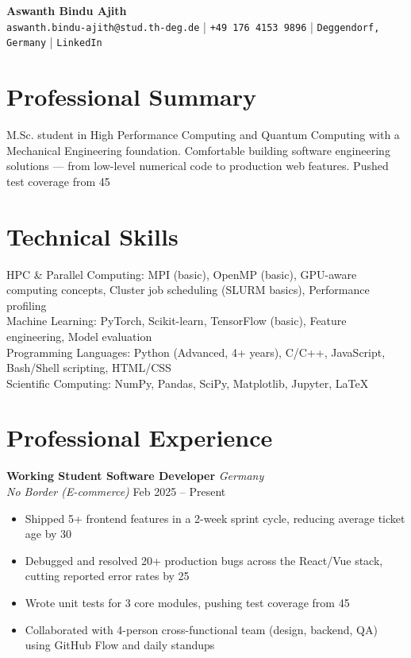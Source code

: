 \documentclass[11pt,a4paper]{article}
\newcommand{\entryheader}[4]{%
    \textbf{#1} \hfill \textit{#2}\\
    \textit{#3} \hfill #4
}
\begin{document}
\begin{center}
    {\LARGE\bfseries Aswanth Bindu Ajith}\\[4pt]
    \texttt{aswanth.bindu-ajith@stud.th-deg.de} | \texttt{+49 176 4153 9896} | \texttt{Deggendorf, Germany} | \texttt{LinkedIn}
\end{center}

\section{Professional Summary}
M.Sc. student in High Performance Computing and Quantum Computing with a Mechanical Engineering foundation. Comfortable building software engineering solutions — from low-level numerical code to production web features. Pushed test coverage from 45%

\section{Technical Skills}

HPC & Parallel Computing: MPI (basic), OpenMP (basic), GPU-aware computing concepts, Cluster job scheduling (SLURM basics), Performance profiling\\

Machine Learning: PyTorch, Scikit-learn, TensorFlow (basic), Feature engineering, Model evaluation\\

Programming Languages: Python (Advanced, 4+ years), C/C++, JavaScript, Bash/Shell scripting, HTML/CSS\\

Scientific Computing: NumPy, Pandas, SciPy, Matplotlib, Jupyter, LaTeX


\section{Professional Experience}

\entryheader{ Working Student Software Developer }{ Germany }{ No Border (E-commerce) }{ Feb 2025 – Present }
\begin{itemize}[leftmargin=*,nosep,topsep=2pt]
    
    \item Shipped 5+ frontend features in a 2-week sprint cycle, reducing average ticket age by 30%
    
    \item Debugged and resolved 20+ production bugs across the React/Vue stack, cutting reported error rates by 25%
    
    \item Wrote unit tests for 3 core modules, pushing test coverage from 45%
    
    \item Collaborated with 4-person cross-functional team (design, backend, QA) using GitHub Flow and daily standups
    
\end{itemize}
\end{document}
